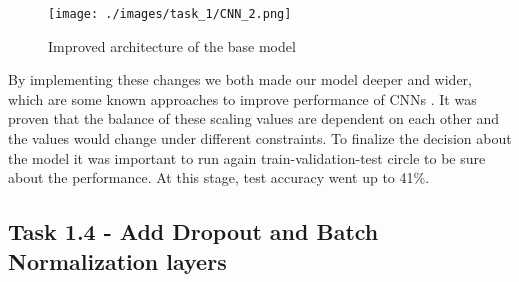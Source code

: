 \documentclass{article} %
\begin{document}
\begin{figure}[h!]
    \centering     
    \texttt{[image: ./images/task\_1/CNN\_2.png]} 
    \caption{Improved architecture of the base model}
    \label{fig:improvedArchitecture}
\end{figure}


By implementing these changes we both made our model deeper and wider, which are some known approaches to improve performance of CNNs \cite{tan2019efficientnet}. It was proven that the balance of these scaling values are dependent on each other and the values would change under different constraints. To finalize the decision about the model it was important to run again train-validation-test circle to be sure about the performance. At this stage, test accuracy went up to 41\%.

\subsection*{Task 1.4 - Add Dropout and Batch Normalization layers}
\end{document}
